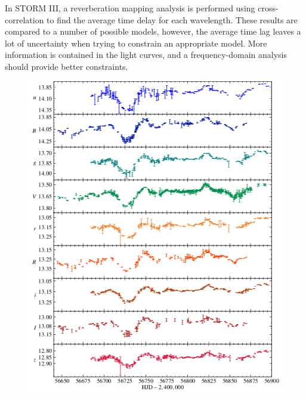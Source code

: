 \documentclass[11pt,letterpaper]{article}
\begin{document}
In STORM III, a reverberation mapping analysis is performed using cross-correlation to find the average time delay for each wavelength. These results are compared to a number of possible models, however, the average time lag leaves a lot of uncertainty when trying to constrain an appropriate model. More information is contained in the light curves, and a frequency-domain analysis should provide better constraints.

\begin{figure}
    \centering
    \begin{minipage}{.475\textwidth}
        \centering
        \includegraphics[width=1\linewidth]{../img/lightcurves.pdf}
        \label{fig:lightcurves}
    \end{minipage}
    \hfill
    \begin{minipage}{.475\textwidth}
        \centering

\end{minipage}
\end{figure}
\end{document}
